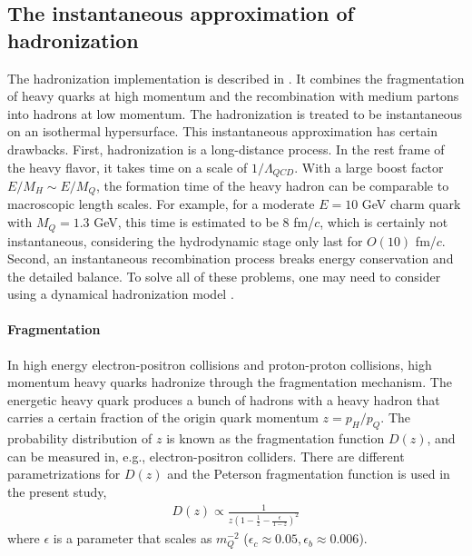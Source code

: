 \subsection{The instantaneous approximation of hadronization} 
The hadronization implementation is described in \cite{Cao:2013ita}.
It combines the fragmentation of heavy quarks at high momentum and the recombination with medium partons into hadrons at low momentum.
The hadronization is treated to be instantaneous on an isothermal hypersurface.
This instantaneous approximation has certain drawbacks.
First, hadronization is a long-distance process. 
In the rest frame of the heavy flavor, it takes time on a scale of $1/\Lambda_{QCD}$. 
With a large boost factor $E/M_H\sim E/M_Q$, the formation time of the heavy hadron can be comparable to macroscopic length scales.
For example, for a moderate $E=10$ GeV charm quark with $M_Q=1.3$ GeV, this time is estimated to be $8$ fm/$c$, which is certainly not instantaneous, considering the hydrodynamic stage only last for $O(10)$ fm/$c$.
Second, an instantaneous recombination process breaks energy conservation and the detailed balance.
To solve all of these problems, one may need to consider using a dynamical hadronization model \cite{He:2019vgs}.

\paragraph{Fragmentation} 
In high energy electron-positron collisions and proton-proton collisions, high momentum heavy quarks hadronize through the fragmentation mechanism.
The energetic heavy quark produces a bunch of hadrons with a heavy hadron that carries a certain fraction of the origin quark momentum $z = p_H/p_Q$.
The probability distribution of $z$ is known as the fragmentation function $D(z)$, and can be measured in, e.g., electron-positron colliders.
There are different parametrizations for $D(z)$ and the Peterson fragmentation function \cite{PhysRevD.27.105} is used in the present study,
\begin{eqnarray}
D(z) \propto \frac{1}{z(1-\frac{1}{z} - \frac{\epsilon}{1-z})^2}
\end{eqnarray}
where $\epsilon$ is a parameter that scales as $m_Q^{-2}$ ($\epsilon_c \approx 0.05, \epsilon_b \approx 0.006$).

